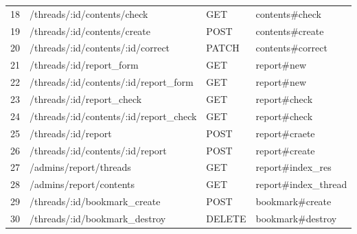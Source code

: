 \documentclass[a4j]{jarticle}
\begin{document}
\begin{table}[htb]
\begin{tabular}{|c|l|l||l|}

	18 & /threads/:id/contents/check	& GET & contents\#check \\
	19 & /threads/:id/contents/create & POST  & contents\#create \\
	20 & /threads/:id/contents/:id/correct & PATCH & contents\#correct \\ \hline

  21 & /threads/:id/report\_form & GET & report\#new \\
  22 & /threads/:id/contents/:id/report\_form & GET & report\#new \\
  23 & /threads/:id/report\_check & GET & report\#check \\
  24 & /threads/:id/contents/:id/report\_check & GET & report\#check \\
  25 & /threads/:id/report & POST & report\#craete \\
  26 & /threads/:id/contents/:id/report & POST & report\#create \\
  27 & /admins/report/threads & GET & report\#index\_res \\ 
  28 & /admins/report/contents & GET & report\#index\_thread \\ \hline

  29 & /threads/:id/bookmark\_create & POST & bookmark\#create \\
  30 & /threads/:id/bookmark\_destroy & DELETE & bookmark\#destroy \\ \hline

\end{tabular}

\end{table}
\end{document}
